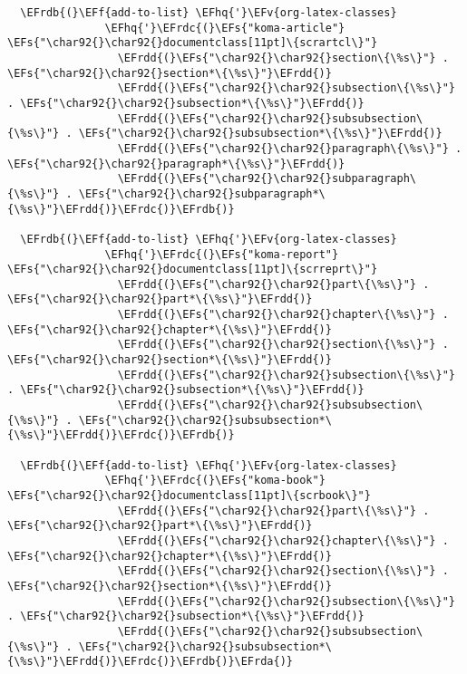 \documentclass{article}
\newcommand{\EFs}[1]{\textcolor{EFs}{#1}} %
\newcommand{\EFf}[1]{\textcolor{EFf}{#1}} %
\newcommand{\EFv}[1]{\textcolor{EFv}{#1}} %
\newcommand{\EFhq}[1]{#1} %
\newcommand{\EFrda}[1]{\textcolor{EFrda}{#1}} %
\newcommand{\EFrdb}[1]{\textcolor{EFrdb}{#1}} %
\newcommand{\EFrdc}[1]{\textcolor{EFrdc}{#1}} %
\newcommand{\EFrdd}[1]{\textcolor{EFrdd}{#1}} %
\begin{document}
\begin{Code}
\begin{Verbatim}
  \EFrdb{(}\EFf{add-to-list} \EFhq{'}\EFv{org-latex-classes}
               \EFhq{'}\EFrdc{(}\EFs{"koma-article"} \EFs{"\char92{}\char92{}documentclass[11pt]\{scrartcl\}"}
                 \EFrdd{(}\EFs{"\char92{}\char92{}section\{\%s\}"} . \EFs{"\char92{}\char92{}section*\{\%s\}"}\EFrdd{)}
                 \EFrdd{(}\EFs{"\char92{}\char92{}subsection\{\%s\}"} . \EFs{"\char92{}\char92{}subsection*\{\%s\}"}\EFrdd{)}
                 \EFrdd{(}\EFs{"\char92{}\char92{}subsubsection\{\%s\}"} . \EFs{"\char92{}\char92{}subsubsection*\{\%s\}"}\EFrdd{)}
                 \EFrdd{(}\EFs{"\char92{}\char92{}paragraph\{\%s\}"} . \EFs{"\char92{}\char92{}paragraph*\{\%s\}"}\EFrdd{)}
                 \EFrdd{(}\EFs{"\char92{}\char92{}subparagraph\{\%s\}"} . \EFs{"\char92{}\char92{}subparagraph*\{\%s\}"}\EFrdd{)}\EFrdc{)}\EFrdb{)}

  \EFrdb{(}\EFf{add-to-list} \EFhq{'}\EFv{org-latex-classes}
               \EFhq{'}\EFrdc{(}\EFs{"koma-report"} \EFs{"\char92{}\char92{}documentclass[11pt]\{scrreprt\}"}
                 \EFrdd{(}\EFs{"\char92{}\char92{}part\{\%s\}"} . \EFs{"\char92{}\char92{}part*\{\%s\}"}\EFrdd{)}
                 \EFrdd{(}\EFs{"\char92{}\char92{}chapter\{\%s\}"} . \EFs{"\char92{}\char92{}chapter*\{\%s\}"}\EFrdd{)}
                 \EFrdd{(}\EFs{"\char92{}\char92{}section\{\%s\}"} . \EFs{"\char92{}\char92{}section*\{\%s\}"}\EFrdd{)}
                 \EFrdd{(}\EFs{"\char92{}\char92{}subsection\{\%s\}"} . \EFs{"\char92{}\char92{}subsection*\{\%s\}"}\EFrdd{)}
                 \EFrdd{(}\EFs{"\char92{}\char92{}subsubsection\{\%s\}"} . \EFs{"\char92{}\char92{}subsubsection*\{\%s\}"}\EFrdd{)}\EFrdc{)}\EFrdb{)}

  \EFrdb{(}\EFf{add-to-list} \EFhq{'}\EFv{org-latex-classes}
               \EFhq{'}\EFrdc{(}\EFs{"koma-book"} \EFs{"\char92{}\char92{}documentclass[11pt]\{scrbook\}"}
                 \EFrdd{(}\EFs{"\char92{}\char92{}part\{\%s\}"} . \EFs{"\char92{}\char92{}part*\{\%s\}"}\EFrdd{)}
                 \EFrdd{(}\EFs{"\char92{}\char92{}chapter\{\%s\}"} . \EFs{"\char92{}\char92{}chapter*\{\%s\}"}\EFrdd{)}
                 \EFrdd{(}\EFs{"\char92{}\char92{}section\{\%s\}"} . \EFs{"\char92{}\char92{}section*\{\%s\}"}\EFrdd{)}
                 \EFrdd{(}\EFs{"\char92{}\char92{}subsection\{\%s\}"} . \EFs{"\char92{}\char92{}subsection*\{\%s\}"}\EFrdd{)}
                 \EFrdd{(}\EFs{"\char92{}\char92{}subsubsection\{\%s\}"} . \EFs{"\char92{}\char92{}subsubsection*\{\%s\}"}\EFrdd{)}\EFrdc{)}\EFrdb{)}\EFrda{)}

\end{Verbatim}
\end{Code}
\end{document}

